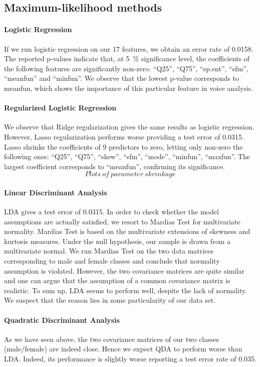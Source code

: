 \subsection{Maximum-likelihood methods}
\paragraph{Logistic Regression}
If we run logistic regression on our \num{17} features, we obtain an error rate of 0.0158. The reported p-values indicate that, at \SI{5}{\percent} significance level, the coefficients of the following features are significantly non-zero: ``Q25'', ``Q75'', ``sp.ent'', ``sfm'', ``meanfun'' and ``minfun''. We observe that the lowest p-value corresponds to meanfun, which shows the importance of this particular feature in voice analysis.

\paragraph{Regularized Logistic Regression}
We observe that Ridge regularization gives the same results as logistic regression. However, Lasso regularization performs worse providing a test error of \num{0.0315}. Lasso shrinks the coefficients of 9 predictors to zero, letting only non-zero the following ones: ``Q25'', ``Q75'', ``skew'', ``sfm'', ``mode'', ``minfun'', ``maxfun''. The largest coefficient corresponds to ``meanfun'', confirming its significance.
$$ Plots ~ of ~ parameter~skrinkage$$ 

\paragraph{Linear Discriminant Analysis}
LDA gives a test error of \num{0.0315}. In order to check whether the model assumptions are actually satisfied, we resort to Mardias Test for multivariate normality. Mardias Test is based on the multivariate extensions of skewness and kurtosis measures. Under the null hypothesis, our sample is drawn from a multivariate normal. 
We run Mardias Test on the two data matrices corresponding to male and female classes and conclude that normality assumption is violated. However, the two covariance matrices are quite similar and one can argue that the assumption of a common covariance matrix is realistic. 
To sum up, LDA seems to perform well, despite the lack of normality. We suspect that the reason lies in some particularity of our data set.


\paragraph{Quadratic Discriminant Analysis}
As we have seen above, the two covariance matrices of our two classes (male/female) are indeed close. Hence we expect QDA to perform worse than LDA. Indeed, its performance is slightly worse reporting a test error rate of \num{0.035}.


